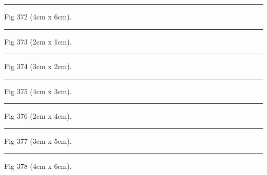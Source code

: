 \documentclass[a4paper,11pt]{article}
\begin{document}
\begin{swarmwrap}%
  \begin{minipage}[t]{4cm}
    \centering
    \rule{\linewidth}{6cm}
    {\footnotesize Fig 372 (4cm x 6cm).}
  \end{minipage}%
\end{swarmwrap}%
\swarmwrapnext
\lipsum[72]%

\begin{swarmwrap}%
  \begin{minipage}[t]{2cm}
    \centering
    \rule{\linewidth}{1cm}
    {\footnotesize Fig 373 (2cm x 1cm).}
  \end{minipage}%
\end{swarmwrap}%
\swarmwrapnext
\lipsum[73]%

\begin{swarmwrap}%
  \begin{minipage}[t]{3cm}
    \centering
    \rule{\linewidth}{2cm}
    {\footnotesize Fig 374 (3cm x 2cm).}
  \end{minipage}%
\end{swarmwrap}%
\swarmwrapnext
\lipsum[74]%

\begin{swarmwrap}%
  \begin{minipage}[t]{4cm}
    \centering
    \rule{\linewidth}{3cm}
    {\footnotesize Fig 375 (4cm x 3cm).}
  \end{minipage}%
\end{swarmwrap}%
\swarmwrapnext
\lipsum[75]%

\begin{swarmwrap}%
  \begin{minipage}[t]{2cm}
    \centering
    \rule{\linewidth}{4cm}
    {\footnotesize Fig 376 (2cm x 4cm).}
  \end{minipage}%
\end{swarmwrap}%
\swarmwrapnext
\lipsum[76]%

\begin{swarmwrap}%
  \begin{minipage}[t]{3cm}
    \centering
    \rule{\linewidth}{5cm}
    {\footnotesize Fig 377 (3cm x 5cm).}
  \end{minipage}%
\end{swarmwrap}%
\swarmwrapnext
\lipsum[77]%

\begin{swarmwrap}%
  \begin{minipage}[t]{4cm}
    \centering
    \rule{\linewidth}{6cm}
    {\footnotesize Fig 378 (4cm x 6cm).}
  \end{minipage}%
\end{swarmwrap}%
\swarmwrapnext
\lipsum[78]%
\end{document}

